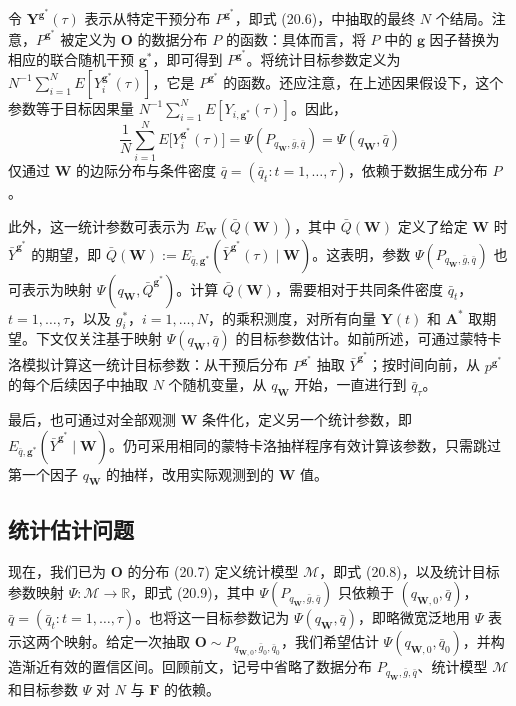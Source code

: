 令 $\mathbf Y^{\mathbf g^*}(\tau)$ 表示从特定干预分布 $P^{\mathbf g^*}$，即式 (20.6)，中抽取的最终 $N$ 个结局。注意，$P^{\mathbf g^*}$ 被定义为 $\mathbf O$ 的数据分布 $P$ 的函数：具体而言，将 $P$ 中的 $\mathbf g$ 因子替换为相应的联合随机干预 $\mathbf g^*$，即可得到 $P^{\mathbf g^*}$。将统计目标参数定义为 $N^{-1}\sum_{i=1}^NE[Y_i^{\mathbf g^*}(\tau)]$，它是 $P^{\mathbf g^*}$ 的函数。还应注意，在上述因果假设下，这个参数等于目标因果量 $N^{-1}\sum_{i=1}^NE[Y_{i,\mathbf g^*}(\tau)]$。因此，
\begin{equation}
 \frac1N\sum_{i=1}^NE\bigl[Y_i^{\mathbf g^*}(\tau)\bigr]
 =\Psi(P_{q_{\mathbf W},\bar g,\bar q})=\Psi(q_{\mathbf W},\bar q)
 \tag{20.9}
\end{equation}
仅通过 $\mathbf W$ 的边际分布与条件密度 $\bar q=(\bar q_t:t=1,\ldots,\tau)$，依赖于数据生成分布 $P$。

此外，这一统计参数可表示为 $E_{\mathbf W}(\bar Q(\mathbf W))$，其中 $\bar Q(\mathbf W)$ 定义了给定 $\mathbf W$ 时 $\bar Y^{\mathbf g^*}$ 的期望，即 $\bar Q(\mathbf W):=E_{\bar q,\mathbf g^*}(\bar Y^{\mathbf g^*}(\tau)\mid\mathbf W)$。这表明，参数 $\Psi(P_{q_{\mathbf W},\bar g,\bar q})$ 也可表示为映射 $\Psi(q_{\mathbf W},\bar Q^{\mathbf g^*})$。计算 $\bar Q(\mathbf W)$，需要相对于共同条件密度 $\bar q_t$，$t=1,\ldots,\tau$，以及 $g_i^*$，$i=1,\ldots,N$，的乘积测度，对所有向量 $\mathbf Y(t)$ 和 $\mathbf A^*$ 取期望。下文仅关注基于映射 $\Psi(q_{\mathbf W},\bar q)$ 的目标参数估计。如前所述，可通过蒙特卡洛模拟计算这一统计目标参数：从干预后分布 $P^{\mathbf g^*}$ 抽取 $\bar Y^{\mathbf g^*}$；按时间向前，从 $p^{\mathbf g^*}$ 的每个后续因子中抽取 $N$ 个随机变量，从 $q_{\mathbf W}$ 开始，一直进行到 $\bar q_\tau$。

最后，也可通过对全部观测 $\mathbf W$ 条件化，定义另一个统计参数，即 $E_{\bar q,\mathbf g^*}(\bar Y^{\mathbf g^*}\mid\mathbf W)$。仍可采用相同的蒙特卡洛抽样程序有效计算该参数，只需跳过第一个因子 $q_{\mathbf W}$ 的抽样，改用实际观测到的 $\mathbf W$ 值。

\subsection{统计估计问题}

现在，我们已为 $\mathbf O$ 的分布 (20.7) 定义统计模型 $\mathcal M$，即式 (20.8)，以及统计目标参数映射 $\Psi:\mathcal M\to\mathbb R$，即式 (20.9)，其中 $\Psi(P_{q_{\mathbf W},\bar g,\bar q})$ 只依赖于 $(q_{\mathbf W,0},\bar q)$，$\bar q=(\bar q_t:t=1,\ldots,\tau)$。也将这一目标参数记为 $\Psi(q_{\mathbf W},\bar q)$，即略微宽泛地用 $\Psi$ 表示这两个映射。给定一次抽取 $\mathbf O\sim P_{q_{\mathbf W,0},\bar g_0,\bar q_0}$，我们希望估计 $\Psi(q_{\mathbf W,0},\bar q_0)$，并构造渐近有效的置信区间。回顾前文，记号中省略了数据分布 $P_{q_{\mathbf W},\bar g,\bar q}$、统计模型 $\mathcal M$ 和目标参数 $\Psi$ 对 $N$ 与 $\mathbf F$ 的依赖。

